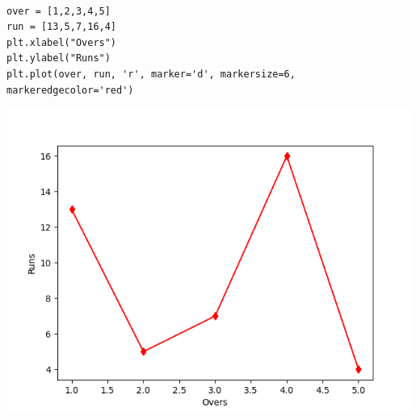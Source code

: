 \documentclass[11pt]{article}
\begin{document}
\begin{verbatim}

over = [1,2,3,4,5]
run = [13,5,7,16,4]
plt.xlabel("Overs")
plt.ylabel("Runs")
plt.plot(over, run, 'r', marker='d', markersize=6, markeredgecolor='red')

\end{verbatim}

\begin{center}
\includegraphics[width=.9\linewidth]{fig2.png}
\end{center}
\end{document}
